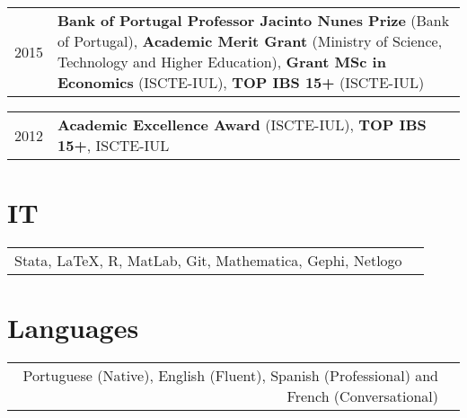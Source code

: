 \documentclass[a4paper,11pt]{article} %
\begin{document}
\begin{tabular}{r|p{13cm}}	
	2015 & \textbf{Bank of Portugal Professor Jacinto Nunes Prize} (Bank of Portugal), \textbf{Academic Merit Grant} (Ministry of Science, Technology and Higher Education), \textbf{Grant MSc in Economics} (ISCTE-IUL), \textbf{TOP IBS 15+} (ISCTE-IUL) \\
\end{tabular}

\begin{tabular}{r|p{13cm}}		
	2012 & \textbf{Academic Excellence Award} (ISCTE-IUL), \textbf{TOP IBS 15+}, ISCTE-IUL \\
\end{tabular}		
%	



\section[IT]{\faKeyboardO \hspace{3pt} IT}

\begin{tabular}{rl}
	Stata, {\fb \LaTeX}, \textsc{R}, MatLab, Git, Mathematica, Gephi, Netlogo 
\end{tabular}


\section[Languages]{\faLanguage \hspace{3pt} Languages}

\begin{tabular}{rp{13cm}}
Portuguese (Native), English (Fluent), Spanish (Professional) and French (Conversational)

\end{tabular}

\end{document}
